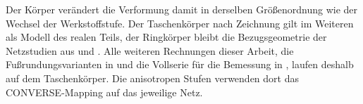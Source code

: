 
Der Körper verändert die Verformung damit in derselben Größenordnung wie der Wechsel der Werkstoffstufe. Der Taschenkörper nach Zeichnung gilt im Weiteren als Modell des realen Teils, der Ringkörper bleibt die Bezugsgeometrie der Netzstudien aus  und . Alle weiteren Rechnungen dieser Arbeit, die Fußrundungsvarianten in  und die Vollserie für die Bemessung in , laufen deshalb auf dem Taschenkörper. Die anisotropen Stufen verwenden dort das CONVERSE-Mapping auf das jeweilige Netz.

